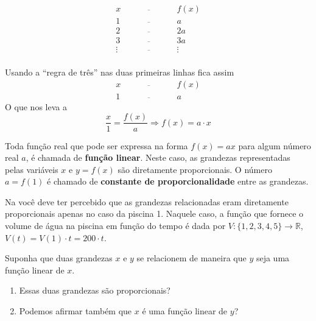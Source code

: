 \[\begin{array}{ccc}
x\quad &\overline{\quad \quad \quad}& \quad f(x) \\
1 \quad &\overline{\quad \quad \quad}& \quad a \\
2 \quad &\overline{\quad \quad \quad}& \quad 2a \\
3 \quad &\overline{\quad \quad \quad}& \quad 3a \\
\vdots \quad &\overline{\quad \quad \quad}& \quad \vdots\\
  \end{array}\]

\begin{observation}{}
Usando a ``regra de três'' nas duas primeiras linhas fica assim
\[\begin{array}{ccc}
x \quad &\overline{\quad \quad \quad}& \quad f(x)\\
1\quad &\overline{\quad \quad \quad}& \quad a \end{array}\]
O que nos leva a
\[\dfrac x1 = \dfrac {f(x)}a \Longrightarrow f(x) = a\cdot x\]
\end{observation}

Toda função real que pode ser expressa na forma $f(x)=ax$ para algum número real $a$, é chamada de \textbf{função linear}. Neste caso, as grandezas representadas pelas variáveis $x$ e $y=f(x)$ são diretamente proporcionais. O número $a=f(1)$ é chamado de \textbf{constante de proporcionalidade} entre as grandezas.


Na  você deve ter percebido que as grandezas relacionadas eram diretamente proporcionais apenas no caso da piscina 1. Naquele caso, a função que fornece o volume de água na piscina em função do tempo é dada por \(V:\{1,2,3,4,5\}\to \mathbb{R}\),   \(V(t)=V(1)\cdot t=200\cdot t\).

\begin{reflection}

Suponha que duas grandezas \(x\) e \(y\) se relacionem de maneira que \(y\) seja uma função linear de \(x\).
\begin{enumerate}
\item {} 
Essas duas grandezas são proporcionais?

\item {} 
Podemos afirmar também que \(x\) é uma função linear de \(y\)?

\end{enumerate}
\end{reflection}

